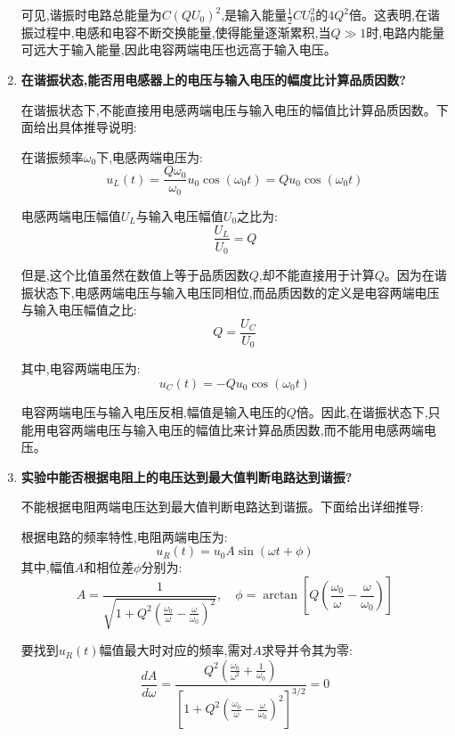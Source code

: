 \documentclass[UTF8]{ctexart}
\begin{document}
\begin{enumerate}
可见,谐振时电路总能量为$C(QU_0)^2$,是输入能量$\frac{1}{2}CU_0^2$的$4Q^2$倍。这表明,在谐振过程中,电感和电容不断交换能量,使得能量逐渐累积,当$Q\gg1$时,电路内能量可远大于输入能量,因此电容两端电压也远高于输入电压。
    
    \item \textbf{在谐振状态,能否用电感器上的电压与输入电压的幅度比计算品质因数?}
    
    在谐振状态下,不能直接用电感两端电压与输入电压的幅值比计算品质因数。下面给出具体推导说明:

在谐振频率$\omega_0$下,电感两端电压为:
\begin{equation}
u_L(t) = \frac{Q\omega_0}{\omega_0}u_0\cos(\omega_0 t) = Qu_0\cos(\omega_0 t)
\end{equation}

电感两端电压幅值$U_L$与输入电压幅值$U_0$之比为:
\begin{equation}
\frac{U_L}{U_0} = Q
\end{equation}

但是,这个比值虽然在数值上等于品质因数$Q$,却不能直接用于计算$Q$。因为在谐振状态下,电感两端电压与输入电压同相位,而品质因数的定义是电容两端电压与输入电压幅值之比:
\begin{equation}
Q = \frac{U_C}{U_0}
\end{equation}

其中,电容两端电压为:
\begin{equation}
u_C(t) = -Qu_0\cos(\omega_0 t)
\end{equation}

电容两端电压与输入电压反相,幅值是输入电压的$Q$倍。因此,在谐振状态下,只能用电容两端电压与输入电压的幅值比来计算品质因数,而不能用电感两端电压。
    
    \item \textbf{实验中能否根据电阻上的电压达到最大值判断电路达到谐振?}
    
    不能根据电阻两端电压达到最大值判断电路达到谐振。下面给出详细推导:

根据电路的频率特性,电阻两端电压为:
\begin{equation}
u_R(t) = u_0 A \sin(\omega t + \phi)
\end{equation}
其中,幅值$A$和相位差$\phi$分别为:
\begin{equation}
A = \frac{1}{\sqrt{1 + Q^2(\frac{\omega_0}{\omega} - \frac{\omega}{\omega_0})^2}}, \quad
\phi = \arctan\left[Q\left(\frac{\omega_0}{\omega} - \frac{\omega}{\omega_0}\right)\right]
\end{equation}

要找到$u_R(t)$幅值最大时对应的频率,需对$A$求导并令其为零:
\begin{equation}
\frac{dA}{d\omega} = \frac{Q^2(\frac{\omega_0}{\omega^2} + \frac{1}{\omega_0})}{[1 + Q^2(\frac{\omega_0}{\omega} - \frac{\omega}{\omega_0})^2]^{3/2}} = 0
\end{equation}


\end{enumerate}
\end{document}
